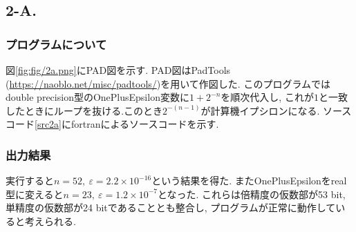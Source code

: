 \subsection*{2-A.}
\subsubsection*{プログラムについて}
図\ref{fig:fig/2a.png}にPAD図を示す.
PAD図はPadTools (\url{https://naoblo.net/misc/padtools/})を用いて作図した.
このプログラムではdouble precision型のOnePlusEpsilon変数に$1+2^{-n}$を順次代入し,
これが$1$と一致したときにループを抜ける.このとき$2^{-(n-1)}$が計算機イプシロンになる.
ソースコード\ref{src2a}にfortranによるソースコードを示す.
\subsubsection*{出力結果}
実行すると$n = 52,\ \varepsilon = 2.2\times10^{-16}$という結果を得た.
またOnePlusEpsilonをreal型に変えると$n = 23,\ \varepsilon = 1.2\times10^{-7}$となった.
これらは倍精度の仮数部が53 bit,単精度の仮数部が24 bitであることとも整合し,
プログラムが正常に動作していると考えられる.\cite{floating}